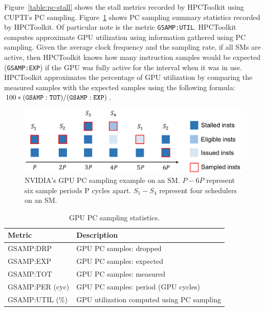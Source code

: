 Figure~\ref{table:pc-stall} shows the stall metrics recorded by HPCToolkit using CUPTI's PC sampling. Figure~\ref{table:gsamp} shows PC sampling summary statistics recorded by HPCToolkit. Of particular note is the metric \verb|GSAMP:UTIL|. HPCToolkit computes approximate GPU utilization using information gathered using PC sampling. Given the average clock frequency and the sampling rate, if all SMs are active, then HPCToolkit knows how many instruction samples would be expected ({\tt GSAMP:EXP}) if the GPU was fully active for the interval when it was in use. HPCToolkit approximates the percentage of GPU utilization by comparing the measured samples with the expected samples using the following formula: $100 * {\tt (GSAMP:TOT)/ (GSAMP:EXP)}$.


\begin{figure}[t]
\includegraphics[width=\textwidth]{fig/mental-model.pdf}
\caption{NVIDIA's GPU PC sampling example on an SM. $P-6P$ represent
six sample periods P cycles apart. $S_{1}-S_{4}$ represent four schedulers on an SM.}
\label{fig:pc sampling}
\vspace{-2ex}
\end{figure}

\begin{table}[t]
\centering
\begin{tabular}{|l|l|}\hline
Metric & Description\\\hline\hline
 GSAMP:DRP  &  GPU PC samples: dropped  \\\hline 
  GSAMP:EXP  &  GPU PC samples: expected  \\\hline 
  GSAMP:TOT  &  GPU PC samples: measured  \\\hline 
  GSAMP:PER (cyc)  &  GPU PC samples: period (GPU cycles)  \\\hline 
  GSAMP:UTIL (\%) & GPU utilization computed using PC sampling\\\hline
\end{tabular}
\caption{GPU PC sampling statistics.}
\label{table:gsamp}
\end{table}



